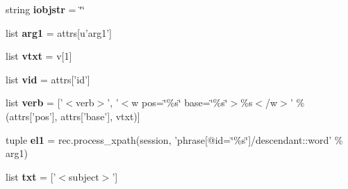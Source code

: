 \begin{DoxyCompactItemize}
\item 
\hypertarget{classcheshire3_1_1textmining_1_1document_factory_1_1_enju_record_document_stream_ab5e0d57d9c5b6b856d9d1f71bb0d29ea}{string {\bfseries iobjstr} = \char`\"{}\char`\"{}}\label{classcheshire3_1_1textmining_1_1document_factory_1_1_enju_record_document_stream_ab5e0d57d9c5b6b856d9d1f71bb0d29ea}

\item 
\hypertarget{classcheshire3_1_1textmining_1_1document_factory_1_1_enju_record_document_stream_ada1481ca9bdba432de801e8f3ce7323e}{list {\bfseries arg1} = attrs\mbox{[}u'arg1'\mbox{]}}\label{classcheshire3_1_1textmining_1_1document_factory_1_1_enju_record_document_stream_ada1481ca9bdba432de801e8f3ce7323e}

\item 
\hypertarget{classcheshire3_1_1textmining_1_1document_factory_1_1_enju_record_document_stream_aad58c6e794e4c32c55918ca216d0a740}{list {\bfseries vtxt} = v\mbox{[}1\mbox{]}}\label{classcheshire3_1_1textmining_1_1document_factory_1_1_enju_record_document_stream_aad58c6e794e4c32c55918ca216d0a740}

\item 
\hypertarget{classcheshire3_1_1textmining_1_1document_factory_1_1_enju_record_document_stream_ab36038d99bcb715a9fbb714fbf25ae2e}{list {\bfseries vid} = attrs\mbox{[}'id'\mbox{]}}\label{classcheshire3_1_1textmining_1_1document_factory_1_1_enju_record_document_stream_ab36038d99bcb715a9fbb714fbf25ae2e}

\item 
\hypertarget{classcheshire3_1_1textmining_1_1document_factory_1_1_enju_record_document_stream_a99773a2b1527e6a2c40770d9893560ef}{list {\bfseries verb} = \mbox{[}'$<$verb$>$', '$<$w pos=\char`\"{}\%s\char`\"{} base=\char`\"{}\%s\char`\"{}$>$\%s$<$/w$>$' \% (attrs\mbox{[}'pos'\mbox{]}, attrs\mbox{[}'base'\mbox{]}, vtxt)\mbox{]}}\label{classcheshire3_1_1textmining_1_1document_factory_1_1_enju_record_document_stream_a99773a2b1527e6a2c40770d9893560ef}

\item 
\hypertarget{classcheshire3_1_1textmining_1_1document_factory_1_1_enju_record_document_stream_a36c79b1ed3105f06ed467fff2aac8ce6}{tuple {\bfseries el1} = rec.\-process\-\_\-xpath(session, 'phrase\mbox{[}@id=\char`\"{}\%s\char`\"{}\mbox{]}/descendant\-::word' \% arg1)}\label{classcheshire3_1_1textmining_1_1document_factory_1_1_enju_record_document_stream_a36c79b1ed3105f06ed467fff2aac8ce6}

\item 
\hypertarget{classcheshire3_1_1textmining_1_1document_factory_1_1_enju_record_document_stream_a6dc2d0f5f5582e79f1d99ba6e5102b91}{list {\bfseries txt} = \mbox{[}'$<$subject$>$'\mbox{]}}\label{classcheshire3_1_1textmining_1_1document_factory_1_1_enju_record_document_stream_a6dc2d0f5f5582e79f1d99ba6e5102b91}


\end{DoxyCompactItemize}
